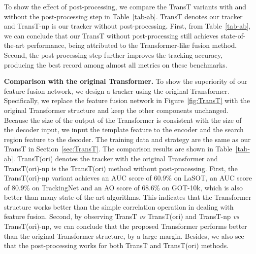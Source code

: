 \documentclass[final]{cvpr}
\begin{document}
To show the effect of post-processing, we compare the TransT variants with and without the post-processing 
step in Table~\ref{tab-ab}. TransT denotes our tracker and TransT-np is our tracker without post-processing. 
First, from Table~\ref{tab-ab}, we can conclude that our TransT 
without post-processing still achieves state-of-the-art performance, being attributed to the Transformer-like 
fusion method. 
Second, the post-processing step further improves the tracking accuracy, producing the best record among almost all 
metrics on these benchmarks. 


{\noindent \textbf{Comparison with the original Transformer. }} 
To show the superiority of our feature fusion network, we design a tracker using the original Transformer. 
Specifically, we replace the feature fusion network in Figure~\ref{fig:TransT} with the original Transformer structure and keep the other components unchanged. 
Because the size of the output of the Transformer is consistent with the size of the decoder input, we input the template feature to the encoder and the search region feature to the decoder. 
The training data and strategy are the same as our TransT in Section~\ref{sec:TransT}. 
The comparison results are shown in Table~\ref{tab-ab}. 
TransT(ori) denotes the tracker with the original Transformer and TransT(ori)-np is the TransT(ori) method 
without post-processing. 
First, the TransT(ori)-np variant achieves an AUC score of 60.9\% on LaSOT, an AUC score of 80.9\% on 
TrackingNet and an AO score of 68.6\% on GOT-10k, which is also better than many state-of-the-art 
algorithms. This indicates that the Transformer structure works better than 
the simple correlation operation in dealing with feature fusion. 
Second, by observing TransT \emph{vs} TransT(ori) and TransT-np \emph{vs} TransT(ori)-np, 
we can conclude that the proposed Transformer performs better than the original Transformer structure, by a large margin. 
Besides, we also see that the post-processing works for both TransT and TransT(ori) methods.
\end{document}
